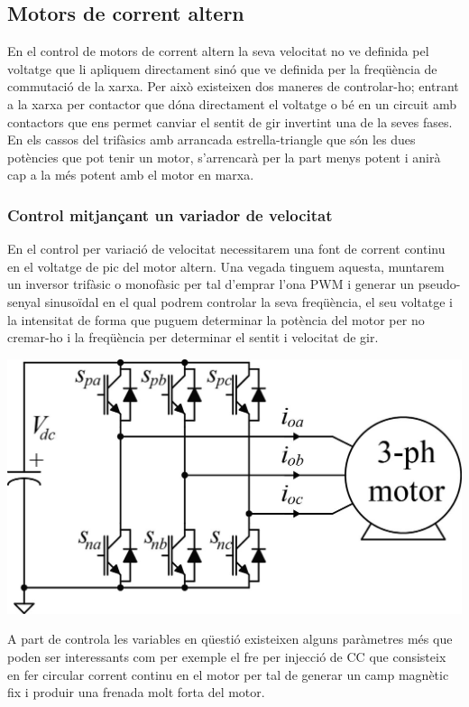 \subsection{Motors de corrent altern}

En el control de motors de corrent altern la seva velocitat no ve definida pel voltatge que li apliquem directament sinó que ve definida per la freqüència de commutació de la xarxa. Per això existeixen dos maneres de controlar-ho; entrant a la xarxa per contactor que dóna directament el voltatge o bé en un circuit amb contactors que ens permet canviar el sentit de gir invertint una de la seves fases. En els cassos del trifàsics amb arrancada estrella-triangle que són les dues potències que pot tenir un motor, s'arrencarà per la part menys potent i anirà cap a la més potent amb el motor en marxa.


\subsubsection{Control mitjançant un variador de velocitat}
En el control per variació de velocitat necessitarem una font de corrent continu en el voltatge de pic del motor altern. Una vegada tinguem aquesta, muntarem un inversor trifàsic o monofàsic per tal d'emprar l'ona PWM i generar un pseudo-senyal sinusoïdal en el qual podrem controlar la seva freqüència, el seu voltatge i la intensitat de forma que puguem determinar la potència del motor per no cremar-ho i la freqüència per determinar el sentit i velocitat de gir.

\includegraphics[width=\textwidth]{Motors/inverter}

A part de controla les variables en qüestió existeixen alguns paràmetres més que poden ser interessants com per exemple el fre per injecció de CC que consisteix en fer circular corrent continu en el motor per tal de generar un camp magnètic fix i produir una frenada molt forta del motor.

